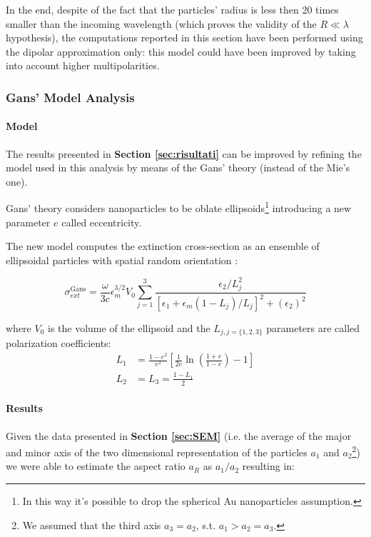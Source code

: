 \documentclass[twocolumn]{article}
\begin{document}
\begin{multicols}{2}
In the end, despite of the fact that the particles' radius is less then 20 times smaller than the incoming wavelength (which proves the validity of the $R\ll \lambda$ hypothesis), the computations reported in this section have been performed  using the dipolar approximation only: this model could have been improved by taking into account higher multipolarities.

\subsubsection{Gans' Model Analysis}
\paragraph{Model}
The results presented in \textbf{Section \ref{sec:risultati}} can be improved by refining the model used in this analysis by means of the Gans' theory (instead of the Mie's one).

Gans' theory considers nanoparticles to be oblate ellipsoids\footnote{In this way it's possible to drop the spherical Au nanoparticles assumption.} introducing a new parameter $e$ called eccentricity.

\noindent
The new model computes the extinction cross-section as an ensemble of ellipsoidal particles with spatial random orientation \cite{mattei}:

\begin{equation*}
\sigma_{ext}^{\text{Gans}} = \frac{\omega}{3c} \epsilon_m^{3/2}V_{0} \sum^{3}_{j=1}{\frac{\epsilon_2/L_j^2}{[\epsilon_1 + \epsilon_m(1-L_j)/L_j]^2 + (\epsilon_2)^2}}
\end{equation*}

\noindent
where $V_0$ is the volume of the ellipsoid and the $L_{j,j=\{1,2,3\}}$ parameters are called polarization coefficients:
\begin{align*}
L_{1}&=\frac{1-e^{2}}{e^{2}}\left[\frac{1}{2 e} \ln \left(\frac{1+e}{1-e}\right)-1\right]\\
L_{2}&=L_{3}=\frac{1-L_{1}}{2}
\end{align*}

\paragraph{Results}
Given the data presented in \textbf{Section \ref{sec:SEM}} (i.e. the average of the major
and minor axis of the two dimensional representation of the particles $a_1$ and $a_2$\footnote{We assumed that the third axis $a_3=a_2$, s.t. $a_1>a_2=a_3$.}) we were able to estimate the aspect ratio $a_R$ as  $a_1/a_2$ resulting in:


\end{multicols}
\end{document}
